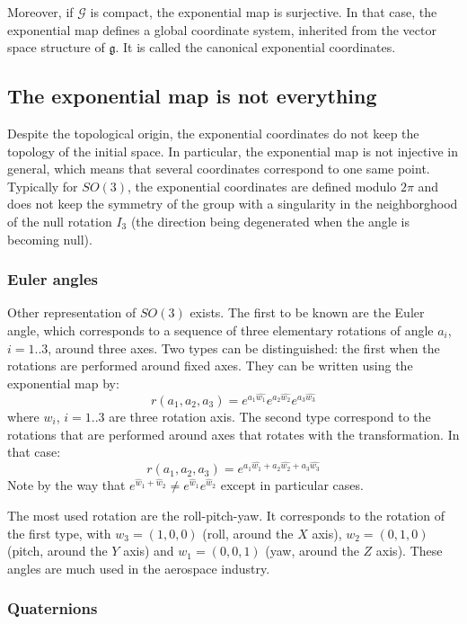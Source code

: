 \documentclass{book}
\begin{document}
Moreover, if $\mathcal{G}$ is compact, the exponential map is surjective. In that case, the exponential map defines a global coordinate system, inherited from the vector space structure of $\mathfrak{g}$. It is called the canonical exponential coordinates.

\subsection{The exponential map is not everything}

Despite the topological origin, the exponential coordinates do not keep the topology of the initial space. In particular, the exponential map is not injective in general, which means that several coordinates correspond to one same point. Typically for $SO(3)$, the exponential coordinates are defined modulo $2 \pi$ and does not keep the symmetry of the group with a singularity in the neighborghood of the null rotation $I_3$ (the direction being degenerated when the angle is becoming null).

\subsubsection{Euler angles}
Other representation of $SO(3)$ exists. The first to be known are the Euler angle, which corresponds to a sequence of three elementary rotations of angle $a_i$, $i=1..3$, around three axes. Two types can be distinguished: the first when the rotations are performed around fixed axes. They can be written using the exponential map by:
\[ r(a_1,a_2,a_3) = e^{a_1 \hat{w_1}} e^{a_2 \hat{w_2}} e^{a_3\hat{w_3}} \]
where $w_i$, $i=1..3$ are three rotation axis.
The second type correspond to the rotations that are performed around axes that rotates with the transformation. In that case:
\[ r(a_1,a_2,a_3) = e^{a_1 \hat{w_1} + a_2 \hat{w_2} + a_3\hat{w_3}} \]
Note by the way that $e^{\hat w_1 + \hat w_2} \neq e^{\hat w_1}e^{\hat w_2}$ except in particular cases.

The most used rotation are the roll-pitch-yaw. It corresponds to the rotation of the first type, with $w_3 = (1,0,0)$ (roll, around the $X$ axis), $w_2 = (0,1,0)$ (pitch, around the $Y$ axis) and $w_1 = (0,0,1)$ (yaw, around the $Z$ axis). These angles are much used in the aerospace industry.

\subsubsection{Quaternions}
\end{document}
